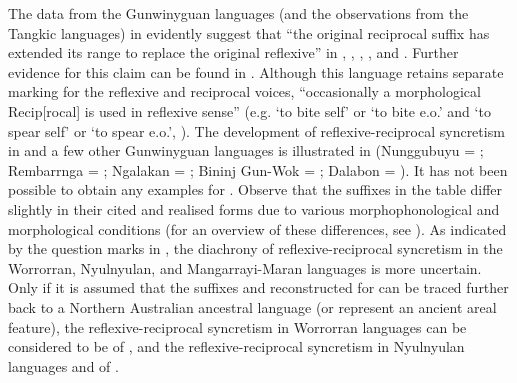 \newpage

The data from the Gunwinyguan languages (and the observations from the Tangkic languages) in  evidently suggest that “the original reciprocal suffix has extended its range to replace the original reflexive” in , , , , and  \citep[343]{alpher:al:2003}. Further evidence for this claim can be found in . Although this language retains separate marking for the reflexive and reciprocal voices, “occasionally a morphological Recip[rocal] is used in reflexive sense” (e.g.  ‘to bite self’ or ‘to bite e.o.’ and  ‘to spear self’ or ‘to spear e.o.’, \citealt[392]{heath:1984}). The development of reflexive-reciprocal syncretism in  and a few other Gunwinyguan languages is illustrated in  (Nunggubuyu = \citealt[392]{heath:1984}; Rembarrnga = \citealt[278, 282]{mckay:1975}; Ngalakan = \citealt[193, 215]{merlan:1983}; Bininj Gun-Wok = \citealt[444]{evans:2003}; Dalabon = \citealt{evans:2017}). It has not been possible to obtain any examples for . Observe that the suffixes in the table differ slightly in their cited and realised forms due to various morphophonological and morphological conditions (for an overview of these differences, see \citealt[342]{alpher:al:2003}). As indicated by the question marks in , the diachrony of reflexive-reciprocal syncretism in the Worrorran, Nyulnyulan, and Mangarrayi-Maran languages is more uncertain. Only if it is assumed that the suffixes  and  reconstructed for  can be traced further back to a Northern Australian ancestral language (or represent an ancient areal feature), the reflexive-reciprocal syncretism in Worrorran languages can be considered to be of , and the reflexive-reciprocal syncretism in Nyulnyulan languages and  of .

